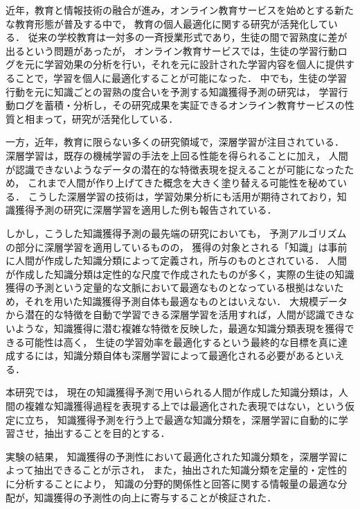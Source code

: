 近年，教育と情報技術の融合が進み，オンライン教育サービスを始めとする新たな教育形態が普及する中で，
教育の個人最適化に関する研究が活発化している．
従来の学校教育は一対多の一斉授業形式であり，生徒の間で習熟度に差が出るという問題があったが，
オンライン教育サービスでは，生徒の学習行動ログを元に学習効果の分析を行い，それを元に設計された学習内容を個人に提供することで，学習を個人に最適化することが可能になった．
中でも，生徒の学習行動を元に知識ごとの習熟の度合いを予測する知識獲得予測の研究は，
学習行動ログを蓄積・分析し，その研究成果を実証できるオンライン教育サービスの性質と相まって，研究が活発化している．

一方，近年，教育に限らない多くの研究領域で，深層学習が注目されている．
深層学習は，既存の機械学習の手法を上回る性能を得られることに加え，
人間が認識できないようなデータの潜在的な特徴表現を捉えることが可能になったため，
これまで人間が作り上げてきた概念を大きく塗り替える可能性を秘めている．
こうした深層学習の技術は，学習効果分析にも活用が期待されており，知識獲得予測の研究に深層学習を適用した例も報告されている．

しかし，こうした知識獲得予測の最先端の研究においても，
予測アルゴリズムの部分に深層学習を適用しているものの，
獲得の対象とされる「知識」は事前に人間が作成した知識分類によって定義され，所与のものとされている．
人間が作成した知識分類は定性的な尺度で作成されたものが多く，実際の生徒の知識獲得の予測という定量的な文脈において最適なものとなっている根拠はないため，それを用いた知識獲得予測自体も最適なものとはいえない．
大規模データから潜在的な特徴を自動で学習できる深層学習を活用すれば，人間が認識できないような，知識獲得に潜む複雑な特徴を反映した，最適な知識分類表現を獲得できる可能性は高く，
生徒の学習効率を最適化するという最終的な目標を真に達成するには，知識分類自体も深層学習によって最適化される必要があるといえる．


本研究では，
現在の知識獲得予測で用いられる人間が作成した知識分類は，人間の複雑な知識獲得過程を表現する上では最適化された表現ではない，という仮定に立ち，
知識獲得予測を行う上で最適な知識分類を，深層学習に自動的に学習させ，抽出することを目的とする．

実験の結果，
知識獲得の予測性において最適化された知識分類を，深層学習によって抽出できることが示され，
また，抽出された知識分類を定量的・定性的に分析することにより，
知識の分野的関係性と回答に関する情報量の最適な分配が，知識獲得の予測性の向上に寄与することが検証された．


